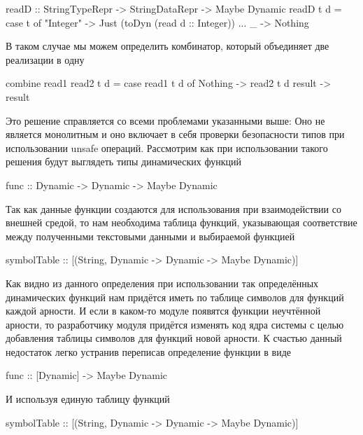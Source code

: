 \documentclass[a4paper,12pt]{article}
\newenvironment{code}{\footnotesize\verbatim}{\endverbatim\normalsize}
\begin{document}
\begin{code}
  readD :: StringTypeRepr -> StringDataRepr -> Maybe Dynamic
  readD t d = case t of
                "Integer" -> Just (toDyn (read d :: Integer))
                ...
                _  -> Nothing
\end{code}

В таком случае мы можем определить комбинатор, который объединяет две
реализации в одну

\begin{code}
  combine read1 read2 t d = case read1 t d of
                              Nothing -> read2 t d
                              result  -> result
\end{code}

Это решение справляется со всеми проблемами указанными выше: Оно не
является монолитным и оно включает в себя проверки безопасности типов
при использовании unsafe операций. Рассмотрим как при использовании
такого решения будут выглядеть типы динамических функций

\begin{code}
  func :: Dynamic -> Dynamic -> Maybe Dynamic
\end{code}

Так как данные функции создаются для использования при взаимодействии
со внешней средой, то нам необходима таблица функций, указывающая
соответствие между полученными текстовыми данными и выбираемой
функцией

\begin{code}
  symbolTable :: [(String, Dynamic -> Dynamic -> Maybe Dynamic)]
\end{code}

Как видно из данного определения при использовании так определённых
динамических функций нам придётся иметь по таблице символов для
функций каждой арности. И если в каком-то модуле появятся функции
неучтённой арности, то разработчику модуля придётся изменять код ядра
системы с целью добавления таблицы символов для функций новой
арности. К счастью данный недостаток легко устранив переписав
определение функции в виде

\begin{code}
  func :: [Dynamic] -> Maybe Dynamic
\end{code}

И используя единую таблицу функций

\begin{code}
  symbolTable :: [(String, Dynamic -> Dynamic -> Maybe Dynamic)]
\end{code}
\end{document}
